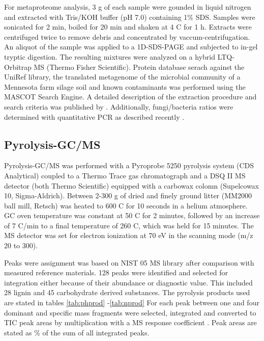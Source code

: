 For metaproteome analysis, 3 g of each sample were gounded in liquid nitrogen and extracted with Tris/KOH buffer (pH 7.0) containing 1\% SDS. Samples were sonicated for 2 min, boiled for 20 min and shaken at 4 \textdegree C for 1 h. Extracts were centrifuged twice to remove debris and concentrated by vaccum-centrifugation. An aliquot of the sample was applied to a 1D-SDS-PAGE and subjected to in-gel tryptic digestion. The resulting mixtures were analyzed on a hybrid LTQ-Orbitrap MS (Thermo Fisher Scientific). Protein database serach against the UniRef library, the translated metagenome of the microbial community of a Mennesota farm silage soil \cite{Tringe2005} and known contaminants was performed using the MASCOT Search Engine. A detailed description of the extraction procedure and search criteria was published by \cite{Schneider2010}. Additionally, fungi/bacteria ratios were determined with quantitative PCR as described recently \cite{Inselsbacher2010}.

\subsection*{Pyrolysis-GC/MS}

Pyrolysis-GC/MS was performed with a Pyroprobe 5250 pyrolysis system (CDS Analytical) coupled to a Thermo Trace gas chromatograph and a DSQ II MS detector (both Thermo Scientific) equipped with a carbowax colomn (Supelcowax 10, Sigma-Aldrich). Between 2-300 \textmu g of dried and finely ground litter (MM2000 ball mill, Retsch) was heated to 600 \textdegree C for 10 seconds in a helium atmosphere. GC oven temperature was constant at 50 \textdegree C for 2 minutes, followed by an increase of 7 \textdegree C/min to a final temperature of 260 \textdegree C, which was held for 15 minutes. The MS detector was set for electron ionization at 70 eV in the scanning mode (m/z 20 to 300).

Peaks were assignment was based on NIST 05 MS library after comparison with measured reference materials. 128 peaks were identified and selected for integration either because of their abundance or diagnostic value. This included 28 lignin and 45 carbohydrate derived substances. The pyrolysis products used are stated in tables \ref{tab:phprod} -\ref{tab:nprod} For each peak between one and four dominant and specific mass fragments were selected, integrated and converted to TIC peak areas by multiplication with a MS response coefficient \cite{Schellekens2009, Kuder1998}. Peak areas are stated as \% of the sum of all integrated peaks.

